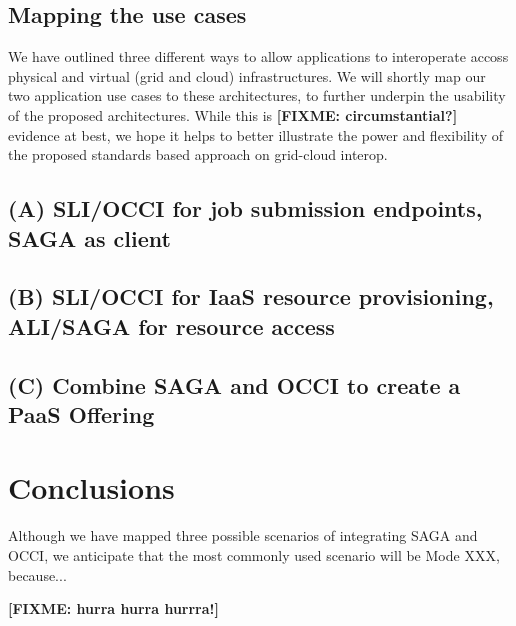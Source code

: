 \documentclass[10pt,conference,final,letterpaper,twoside,twocolumn,]{IEEEtran}
\newcommand{\B}[1]{\textbf{#1}}
\newcommand{\F}[1]{\B{[FIXME: #1]}}
\begin{document}
 \subsection{Mapping the use cases}

 We have outlined three different ways to allow applications to
 interoperate accoss physical and virtual (grid and cloud)
 infrastructures.  We will shortly map our two application use cases
 to these architectures, to further underpin the usability of the
 proposed architectures.  While this is \F{circumstantial?} evidence
 at best, we hope it helps to better illustrate the power and
 flexibility of the proposed standards based approach on grid-cloud
 interop.

 \subsection{(A) SLI/OCCI for job submission endpoints, SAGA as client}

  

 \subsection{(B) SLI/OCCI for IaaS resource provisioning, ALI/SAGA for
 resource access} 
 \subsection{(C) Combine SAGA and OCCI to create a PaaS Offering}


\section{Conclusions}

Although we have mapped three possible scenarios of integrating SAGA
and OCCI, we anticipate that the most commonly used scenario will be
Mode XXX, because...


\label{sec:conc}

 \F{hurra hurra hurrra!}




\end{document}
